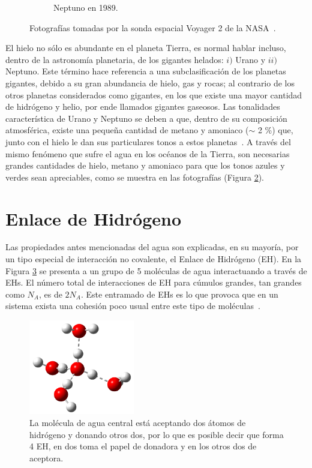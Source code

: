 \begin{figure}
\begin{subfigure}[b]{0.27\linewidth}
\caption{Neptuno en 1989.}
\label{neptuno}
\end{subfigure}
\caption{Fotografías tomadas por la sonda espacial Voyager 2 de la NASA~\cite{urano_neptuno_photo}.}
\label{urano_neptuno}
\end{figure}

El hielo no sólo es abundante en el planeta Tierra, es normal hablar incluso,
dentro de la astronomía planetaria, de los gigantes helados: $i)$ Urano y $ii)$
Neptuno. Este término hace referencia a una subclasificación de los planetas
gigantes, debido a su gran abundancia de hielo, gas y rocas; al contrario de
los otros planetas considerados como gigantes, en los que existe una mayor
cantidad de hidrógeno y helio, por ende llamados gigantes gaseosos. Las
tonalidades característica de Urano y Neptuno se deben a que, dentro de su
composición atmosférica, existe una pequeña cantidad de metano y amoniaco
($\sim$ \num{2} \%) que, junto con el hielo le dan sus particulares tonos a
estos planetas~\cite{Atmospheres_ice}. A través del mismo fenómeno que sufre el
agua en los océanos de la Tierra, son necesarias grandes cantidades de hielo,
metano y amoniaco para que los tonos azules y verdes sean apreciables, como se
muestra en las fotografías (Figura \ref{urano_neptuno}).

\section{Enlace de Hidrógeno}

Las propiedades antes mencionadas del agua son explicadas, en su mayoría, por
un tipo especial de interacción no covalente, el Enlace de Hidrógeno (EH). En
la Figura \ref{4_h2o} se presenta a un grupo de 5 moléculas de agua
interactuando a través de EHs.  El número total de interacciones de EH para
cúmulos grandes, tan grandes como $N_A$, es de $2N_A$. Este entramado de EHs es
lo que provoca que en un sistema exista una cohesión poco usual entre este tipo
de moléculas~\cite{smith2005}.

\begin{figure} %
    \centering
    \includegraphics[width=0.41\textwidth]{2/img/4h2o}
    \caption{La molécula de agua central está aceptando dos átomos de hidrógeno y donando
otros dos, por lo que es posible decir que forma 4 EH, en dos toma el papel de
donadora y en los otros dos de aceptora.}
    \label{4_h2o}
\end{figure}

